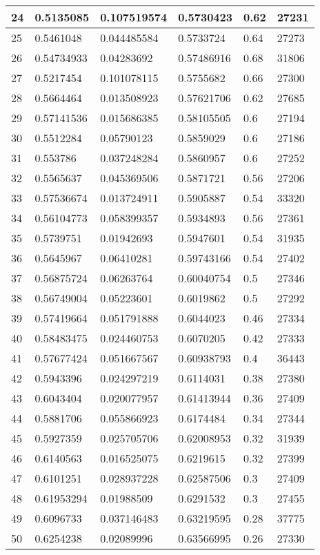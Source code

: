 \begin{longtable}{|l|l|l|l|l|l|}
24 & 0.5135085 & 0.107519574 & 0.5730423 & 0.62 & 27231 \\ \hline 
25 & 0.5461048 & 0.044485584 & 0.5733724 & 0.64 & 27273 \\ \hline 
26 & 0.54734933 & 0.04283692 & 0.57486916 & 0.68 & 31806 \\ \hline 
27 & 0.5217454 & 0.101078115 & 0.5755682 & 0.66 & 27300 \\ \hline 
28 & 0.5664464 & 0.013508923 & 0.57621706 & 0.62 & 27685 \\ \hline 
29 & 0.57141536 & 0.015686385 & 0.58105505 & 0.6 & 27194 \\ \hline 
30 & 0.5512284 & 0.05790123 & 0.5859029 & 0.6 & 27186 \\ \hline 
31 & 0.553786 & 0.037248284 & 0.5860957 & 0.6 & 27252 \\ \hline 
32 & 0.5565637 & 0.045369506 & 0.5871721 & 0.56 & 27206 \\ \hline 
33 & 0.57536674 & 0.013724911 & 0.5905887 & 0.54 & 33320 \\ \hline 
34 & 0.56104773 & 0.058399357 & 0.5934893 & 0.56 & 27361 \\ \hline 
35 & 0.5739751 & 0.01942693 & 0.5947601 & 0.54 & 31935 \\ \hline 
36 & 0.5645967 & 0.06410281 & 0.59743166 & 0.54 & 27402 \\ \hline 
37 & 0.56875724 & 0.06263764 & 0.60040754 & 0.5 & 27346 \\ \hline 
38 & 0.56749004 & 0.05223601 & 0.6019862 & 0.5 & 27292 \\ \hline 
39 & 0.57419664 & 0.051791888 & 0.6044023 & 0.46 & 27334 \\ \hline 
40 & 0.58483475 & 0.024460753 & 0.6070205 & 0.42 & 27333 \\ \hline 
41 & 0.57677424 & 0.051667567 & 0.60938793 & 0.4 & 36443 \\ \hline 
42 & 0.5943396 & 0.024297219 & 0.6114031 & 0.38 & 27380 \\ \hline 
43 & 0.6043404 & 0.020077957 & 0.61413944 & 0.36 & 27409 \\ \hline 
44 & 0.5881706 & 0.055866923 & 0.6174484 & 0.34 & 27344 \\ \hline 
45 & 0.5927359 & 0.025705706 & 0.62008953 & 0.32 & 31939 \\ \hline 
46 & 0.6140563 & 0.016525075 & 0.6219615 & 0.32 & 27399 \\ \hline 
47 & 0.6101251 & 0.028937228 & 0.62587506 & 0.3 & 27409 \\ \hline 
48 & 0.61953294 & 0.01988509 & 0.6291532 & 0.3 & 27455 \\ \hline 
49 & 0.6096733 & 0.037146483 & 0.63219595 & 0.28 & 37775 \\ \hline 
50 & 0.6254238 & 0.02089996 & 0.63566995 & 0.26 & 27330 \\ \hline 
\end{longtable}